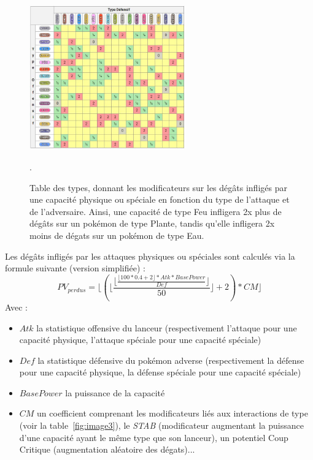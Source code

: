 \documentclass[a4paper,12pt]{article}
\begin{document}
\begin{figure}[!h]
    \centering
    \includegraphics[width=0.6\textwidth]{Image/table-des-types-pour-pokemon-arceus.jpg}
    \caption{Table des types, donnant les modificateurs sur les dégâts infligés
    par une capacité physique ou spéciale en fonction du type de l'attaque et de
    l'adversaire. Ainsi, une capacité de type Feu infligera 2x plus de dégâts
    sur un pokémon de type Plante, tandis qu'elle infligera 2x moins de dégats
    sur un pokémon de type Eau.}.
    \label{fig:image4}
\end{figure}

Les dégâts infligés par les attaques physiques ou spéciales sont calculés via la
formule suivante (version simplifiée) :
\begin{equation}
    PV_{perdus}=\lfloor ( \lfloor \frac{\lfloor \frac{\lfloor 100*0.4+2 \rfloor * Atk * BasePower}{Def}\rfloor}{50}\rfloor +2)*CM \rfloor
\end{equation}
Avec :
\begin{itemize}
    \item $Atk$ la statistique offensive du lanceur (respectivement l'attaque
    pour une capacité physique, l'attaque spéciale pour une capacité spéciale)
    \item $Def$ la statistique défensive du pokémon adverse (respectivement la
    défense pour une capacité physique, la défense spéciale pour une capacité
    spéciale)
    \item $BasePower$ la puissance de la capacité
    \item $CM$ un coefficient comprenant les modificateurs liés aux interactions
    de type (voir la table~\ref{fig:image3}), le \textit{STAB} (modificateur
    augmentant la puissance d'une capacité ayant le même type que son lanceur),
    un potentiel Coup Critique (augmentation aléatoire des dégats)...
\end{itemize}
\end{document}
